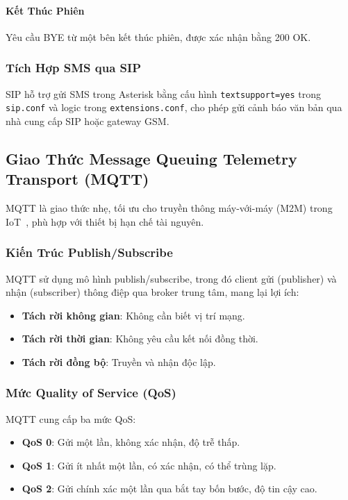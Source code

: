 \paragraph{Kết Thúc Phiên}
Yêu cầu BYE từ một bên kết thúc phiên, được xác nhận bằng 200 OK.

\subsubsection{Tích Hợp SMS qua SIP}
\label{subsubsec:sip_sms}

SIP hỗ trợ gửi SMS trong Asterisk bằng cấu hình \texttt{textsupport=yes} trong \texttt{sip.conf} và logic trong \texttt{extensions.conf}, cho phép gửi cảnh báo văn bản qua nhà cung cấp SIP hoặc gateway GSM.

\subsection{Giao Thức Message Queuing Telemetry Transport (MQTT)}
\label{subsec:mqtt_protocol}

MQTT là giao thức nhẹ, tối ưu cho truyền thông máy-với-máy (M2M) trong IoT~\cite{mqtt_oasis_standard}, phù hợp với thiết bị hạn chế tài nguyên.

\subsubsection{Kiến Trúc Publish/Subscribe}
\label{subsubsec:mqtt_pubsub}

MQTT sử dụng mô hình publish/subscribe, trong đó client gửi (publisher) và nhận (subscriber) thông điệp qua broker trung tâm, mang lại lợi ích:

\begin{itemize}
    \item \textbf{Tách rời không gian}: Không cần biết vị trí mạng.
    \item \textbf{Tách rời thời gian}: Không yêu cầu kết nối đồng thời.
    \item \textbf{Tách rời đồng bộ}: Truyền và nhận độc lập.
\end{itemize}

\subsubsection{Mức Quality of Service (QoS)}
\label{subsubsec:mqtt_qos}

MQTT cung cấp ba mức QoS:

\begin{itemize}
    \item \textbf{QoS 0}: Gửi một lần, không xác nhận, độ trễ thấp.
    \item \textbf{QoS 1}: Gửi ít nhất một lần, có xác nhận, có thể trùng lặp.
    \item \textbf{QoS 2}: Gửi chính xác một lần qua bắt tay bốn bước, độ tin cậy cao.
\end{itemize}

